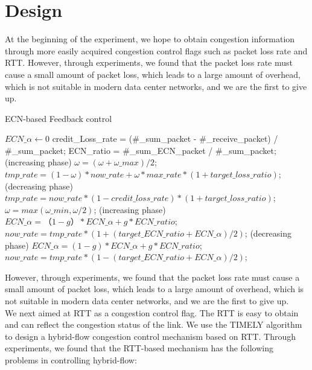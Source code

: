 \documentclass[conference]{IEEEtran}
\begin{document}
\section{Design}
At the beginning of the experiment, we hope to obtain congestion information through more easily acquired congestion control flags such as packet loss rate and RTT. However, through experiments, we found that the packet loss rate must cause a small amount of packet loss, which leads to a large amount of overhead, which is not suitable in modern data center networks, and we are the first to give up.\\
\begin{algorithm}[!h]
\caption{ECN-based Feedback control}
\begin{algorithmic}[1]
\STATE $ECN\_\alpha \gets 0$
\REPEAT
\STATE credit\_Loss\_rate = (\#\_sum\_packet - \#\_receive\_packet) / \#\_sum\_packet;
\STATE ECN\_ratio = \#\_sum\_ECN\_packet / \#\_sum\_packet;
        \STATE (increasing phase)
        \STATE $\omega=(\omega+\omega\_max)/2$;
        \STATE $tmp\_rate = (1-\omega) * now\_rate +\omega*max\_rate*(1+ target\_loss\_ratio)$;
\ELSE
        \STATE (decreasing phase)
        \STATE $tmp\_rate=now\_rate*(1-credit\_loss\_rate)*(1+target\_loss\_ratio)$;
        \STATE $\omega=max(\omega\_min,\omega/2)$;
\ENDIF
{}
        \STATE (increasing phase)
        \STATE $ECN\_\alpha = （1-g）* ECN\_\alpha+g * ECN\_ratio$;
        \STATE $now\_rate = tmp\_rate*(1+(target\_ECN\_ratio +ECN\_\alpha) / 2)$;
\ELSE
        \STATE (decreasing phase)
        \STATE $ECN\_\alpha =(1-g)* ECN\_\alpha+g*ECN\_ratio$;
        \STATE $now\_rate = tmp\_rate*(1-(target\_ECN\_ratio +ECN\_\alpha) / 2)$;
\ENDIF
{}
\end{algorithmic}
\end{algorithm}
\indent However, through experiments, we found that the packet loss rate must cause a small amount of packet loss, which leads to a large amount of overhead, which is not suitable in modern data center networks, and we are the first to give up.\\
\indent We next aimed at RTT as a congestion control flag. The RTT is easy to obtain and can reflect the congestion status of the link. We use the TIMELY algorithm to design a hybrid-flow congestion control mechanism based on RTT. Through experiments, we found that the RTT-based mechanism has the following problems in controlling hybrid-flow:
\end{document}

